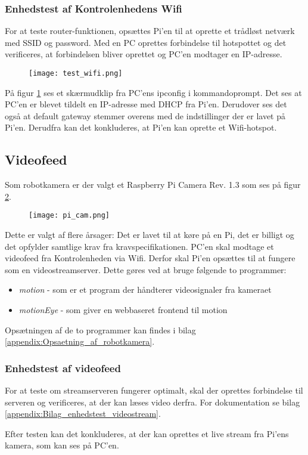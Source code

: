 \subsubsection{Enhedstest af Kontrolenhedens Wifi}
For at teste router-funktionen, opsættes Pi'en til at oprette et trådløst netværk med SSID og password. 
Med en PC oprettes forbindelse til hotspottet og det verificeres, at forbindelsen bliver oprettet og PC’en modtager en IP-adresse.
\begin{figure} [H]
	\centering
	\texttt{[image: test\_wifi.png]}
	\label{fig:wifi_test}
\end{figure}
\newpage
På figur \ref{fig:wifi_test} ses et skærmudklip fra PC'ens ipconfig i kommandoprompt. 
Det ses at PC'en er blevet tildelt en IP-adresse med DHCP fra Pi'en. 
Derudover ses det også at default gateway stemmer overens med de indstillinger der er lavet på Pi’en.
Derudfra kan det konkluderes, at Pi'en kan oprette et Wifi-hotspot.

\subsection{Videofeed}
Som robotkamera er der valgt et Raspberry Pi Camera Rev. 1.3 som ses på figur \ref{fig:pi_cam}.
\begin{figure} [H]
	\centering
	\texttt{[image: pi\_cam.png]}
	\label{fig:pi_cam}
\end{figure}
Dette er valgt af flere årsager:
Det er lavet til at køre på en Pi, det er billigt og det opfylder samtlige krav fra kravspecifikationen.
PC'en skal modtage et videofeed fra Kontrolenheden via Wifi. 
Derfor skal Pi'en opsættes til at fungere som en videostreamserver. 
Dette gøres ved at bruge følgende to programmer:
\begin{itemize}
	\item \textit{motion} \cite{motion} - som er et program der håndterer videosignaler fra kameraet
	\item \textit{motionEye} \cite{motioneye} - som giver en webbaseret frontend til motion
\end{itemize}
Opsætningen af de to programmer kan findes i bilag \ref{appendix:Opsaetning_af_robotkamera}.

\subsubsection{Enhedstest af videofeed}
For at teste om streamserveren fungerer optimalt, skal der oprettes forbindelse til serveren og verificeres, at der kan læses video derfra. For dokumentation se bilag \ref{appendix:Bilag_enhedstest_videostream}.

Efter testen kan det konkluderes, at der kan oprettes et live stream fra Pi'ens kamera, som kan ses på PC'en. 